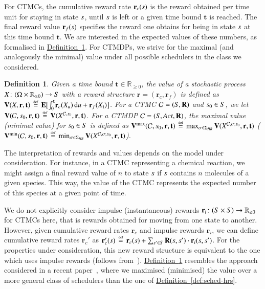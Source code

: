\documentclass[10pt,twocolumn]{article}
\newtheorem{definition}{Definition}
\newcommand{\states} {{\ensuremath S}}
\newcommand{\state}  {{\ensuremath s}}
\newcommand{\reals}  {{\ensuremath {\mathbb{R}}}}
\newcommand{\sched}  {{\ensuremath {\sigma}}}
\newcommand{\acts}{\mathit{Act}}
\newcommand{\rmat}{\mathbf{R}}
\newcommand{\cmodel}{\mathcal{C}}
\newcommand{\diff}{\mathrm{d}}
\newcommand{\schedshr}{\Sigma_\mathit{HR}}
\newcommand{\expect}{\mathbf{E}}
\newcommand{\rew}{\mathbf{r}}
\newcommand{\frew}{\mathbf{r}_f}
\newcommand{\crew}{\mathbf{r}_c}
\newcommand{\irew}{\mathbf{r}_i}
\newcommand{\timeb}{\mathbf{t}}
\newcommand{\mvalue}{\mathbf{V}}
\newcommand{\stopro}{X}
\newcommand{\refdef}[1]{\texorpdfstring{\hyperref[def:#1]{Definition~\ref*{def:#1}}}{Definition \ref*{def:#1}}}
\newcommand{\defeq}{\,\stackrel{\mbox{\rm {\tiny def}}}{=}\,}
\begin{document}
For CTMCs, the cumulative reward rate $\crew(\state)$ is the reward obtained per time unit for staying in state $\state$, until $\state$ is left or a given time bound $\timeb$ is reached.
The final reward value $\frew(\state)$ specifies the reward one obtains for being in state $\state$ at this time bound $\timeb$.
We are interested in the expected values of these numbers, as formalised in \refdef{value}.
For CTMDPs, we strive for the maximal (and analogously the minimal) value under all possible schedulers in the class we considered.
\begin{definition}
  \label{def:value}
Given a time bound $\timeb \in \reals_{\geq 0}$, the \emph{value} of a stochastic process $\stopro\colon (\Omega \times \reals_{\geq 0}) \to \states$ with a reward structure $\rew = (\crew, \frew)$ is defined as $\mvalue(\stopro,\rew,\timeb) \defeq \expect \bigl[\int_0^\timeb \! \crew(\stopro_u) \, \diff u + \frew(\stopro_\timeb)\bigr]$.
  For a CTMC $\cmodel = (\states, \rmat)$ and $\state_0 \in \states$, we let $\mvalue(\cmodel, \state_0, \rew, \timeb) \defeq \mvalue(\stopro^{\cmodel,\state_0},\rew,\timeb)$.
  For a CTMDP $\cmodel = (\states, \acts, \rmat)$, the \emph{maximal value} (\emph{minimal value}) for $\state_0 \in \states$ is defined as $\mvalue^{\max}(\cmodel, \state_0, \rew, \timeb) \defeq \max_{\sched \in \schedshr} \mvalue(\stopro^{\cmodel,\sched,\state_0},\rew, \timeb)$ ($\mvalue^{\min}(\cmodel, \state_0, \rew, \timeb) \defeq \min_{\sched \in \schedshr} \mvalue(\stopro^{\cmodel,\sched,\state_0},\rew, \timeb)$).
\end{definition}
The interpretation of rewards and values depends on the model under consideration.
For instance, in a CTMC representing a chemical reaction, we might assign a final reward value of $n$ to state $\state$ if $\state$ contains $n$ molecules of a given species.
This way, the value of the CTMC represents the expected number of this species at a given point of time.

We do not explicitly consider impulse (instantaneous) rewards $\irew\colon (\states \times \states) \to \reals_{\geq 0}$ for CTMCs here, that is rewards obtained for moving from one state to another.
However, given cumulative reward rates $\crew$ and impulse rewards $\irew$, we can define cumulative reward rates $\crew'$ as $\crew'(\state) \defeq \crew(\state) + \sum_{\state' \in \states} \rmat(\state, \state') \cdot \irew(\state, \state')$.
For the properties under consideration, this new reward structure is equivalent to the one which uses impulse rewards (follows from~\cite[(6)]{KwiatkowskaNP06}).
\refdef{value} resembles the approach considered in a recent paper~\cite{BuchholzHHZ11}, where we maximised (minimised) the value over a more general class of schedulers than the one of \refdef{sched-hrs}.
\end{document}
